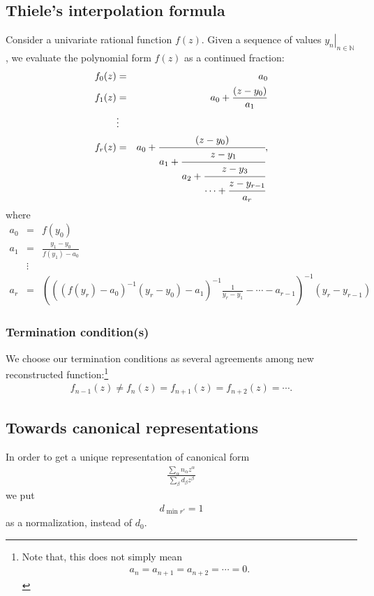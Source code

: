 \documentclass[11pt]{book}
\begin{document}
\subsection{Thiele's interpolation formula}
Consider a univariate rational function $f(z)$.
Given a sequence of values $\left. y_n \right|_{n \in \mathbb{N}}$, we evaluate the polynomial form $f(z)$ as a continued fraction:
\begin{eqnarray}
f_0(z) &=& a_0 \\
f_1(z) &=& a_0 + \frac{(z-y_0)}{a_1} \\
\nonumber
&\vdots& \\
f_r(z) &=& a_0 + \cfrac{(z-y_0)}{a_1 + \cfrac{z-y_1}{a_2 + \cfrac{z- y_3}{\cdots + \cfrac{z-y_{r-1}}{a_r}}}},
\end{eqnarray}
where
\begin{eqnarray}
a_0 &=& f(y_0) \\
a_1 &=& \frac{y_1 - y_0}{f(y_1) - a_0}\\
\nonumber
&\vdots& \\
a_r &=& \left( \left( \left( f(y_r)-a_0 \right)^{-1} (y_r - y_0) - a_1 \right)^{-1} \frac{1}{y_r - y_1} - \cdots - a_{r-1} \right)^{-1} (y_r - y_{r-1}) \qquad\qquad
\end{eqnarray}

\subsubsection{Termination condition(s)}
We choose our termination conditions as several agreements among new reconstructed function:\footnote{
Note that, this does not simply mean
\begin{eqnarray}
a_{n} = a_{n+1} = a_{n+2} = \cdots = 0.
\end{eqnarray}
}
\begin{eqnarray}
f_{n-1}(z) \neq f_n(z) = f_{n+1}(z) = f_{n+2}(z) = \cdots.
\end{eqnarray}

\subsection{Towards canonical representations}
In order to get a unique representation of canonical form
\begin{eqnarray}
\frac{\sum_\alpha n_\alpha z^\alpha}{\sum_\beta d_\beta z^\beta}
\end{eqnarray}
we put
\begin{eqnarray}
d_{\min r'} = 1
\end{eqnarray}
as a normalization, instead of $d_0$.
\end{document}
